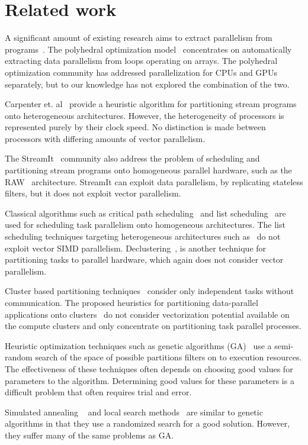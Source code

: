 \section{Related work}
\label{sec:related-work}

A significant amount of existing research aims to extract parallelism
from programs~\cite{mgri98,jdon06,mgor06,gsih93,pcar09}. The
polyhedral optimization model~\cite{mgri98} concentrates on
automatically extracting data parallelism from loops operating on
arrays. The polyhedral optimization community has addressed
parallelization for CPUs and GPUs separately, but to our knowledge has
not explored the combination of the two.

Carpenter et. al~\cite{pcar09} provide a heuristic algorithm for
partitioning stream programs onto heterogeneous architectures.
However, the heterogeneity of processors is represented purely by
their clock speed. No distinction is made between processors with
differing amounts of vector parallelism.

The StreamIt~\cite{wthi02} community also address the problem of
scheduling and partitioning stream programs onto homogeneous parallel
hardware, such as the RAW~\cite{ewai97} architecture. StreamIt can
exploit data parallelism, by replicating stateless filters, but it
does not exploit vector parallelism.

Classical algorithms such as critical path
scheduling~\cite{Kohler1975} and list scheduling~\cite{atho74}
are used for scheduling task parallelism onto homogeneous
architectures. The list scheduling techniques targeting heterogeneous
architectures such as~\cite{htop02} do not exploit vector SIMD
parallelism. Declustering~\cite{gsih93}, is another technique for
partitioning tasks to parallel hardware, which again does not consider
vector parallelism.

Cluster based partitioning techniques~\cite{mmah99,adou04,tbra01}
consider only independent tasks without communication. The proposed
heuristics for partitioning data-parallel applications onto
clusters~\cite{ssan05,skum02} do not consider vectorization potential
available on the compute clusters and only concentrate on partitioning
task parallel processes.

Heuristic optimization techniques such as genetic algorithms
(GA)~\cite{265940,shroff1996genetic,singh1995mapping,wang1996genetic}
use a semi-random search of the space of possible partitions filters on to
execution resources. The effectiveness of these techniques often
depends on
choosing good values for parameters to the algorithm. Determining
good values for these parameters is a difficult problem that
often requires trial and error.

Simulated annealing ~\cite{shroff1996genetic,664363} and local search
methods~\cite{622584,537394} are similar to genetic algorithms in that
they use a randomized search for a good solution. However, they suffer
many of the same problems as GA.




